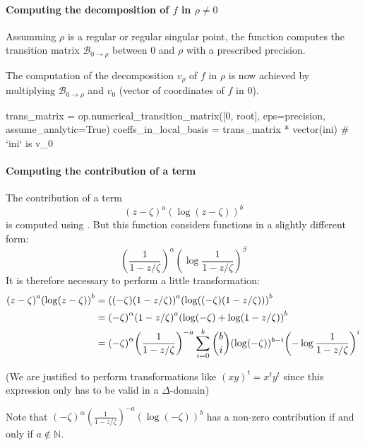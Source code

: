 \documentclass[../main.tex]{subfiles}
\begin{document}
\paragraph{Computing the decomposition of $f$ in $\rho \neq 0$}
Assumming $\rho$ is a regular or regular singular point, the function  computes the transition matrix $\mathcal{B}_{0 \to \rho}$ between 0 and $\rho$ with a prescribed precision.

The computation of the decomposition $v_\rho$ of $f$ in $\rho$ is now achieved by multiplying $\mathcal{B}_{0 \to \rho}$ and $v_0$ (vector of coordinates of $f$ in 0).

\begin{pyblock}
trans_matrix = op.numerical_transition_matrix([0, root],
											  eps=precision,
											  assume_analytic=True)
coeffs_in_local_basis = trans_matrix * vector(ini)  # `ini` is v_0
\end{pyblock}


\paragraph{Computing the contribution of a term}

The contribution of a term $${(z - \zeta)}^a {(\log (z - \zeta))}^b$$ is computed using . But this function considers functions in a slightly different form: $${\left(\frac{1}{1 - z/\zeta}\right)}^\alpha {\left(\log \frac{1}{1 - z/\zeta}\right)}^\beta$$
It is therefore necessary to perform a little transformation:
\begin{align*}
	{(z - \zeta)}^a {(\log (z - \zeta))}^b &= {((-\zeta)(1 - z/\zeta))}^a {(\log ((-\zeta)(1 - z/\zeta)))}^b \\
										   &= {(-\zeta)}^\alpha {(1 - z/\zeta)}^a {\left(\log (-\zeta) + \log (1 - z/\zeta)\right)}^b\\
										   &= {(-\zeta)}^\alpha {\left(\frac{1}{1 - z/\zeta}\right)}^{-a}
										   			\sum\limits_{i = 0}^b {b \choose i} (\log (-\zeta))^{b-i} {\left(-\log \frac{1}{1 - z/\zeta}\right)}^i
\end{align*}

(We are justified to perform transformations like $(xy)^t = x^t y^t$ since this expression only has to be valid in a $\Delta$-domain)

Note that ${(-\zeta)}^\alpha {\left(\frac{1}{1 - z/\zeta}\right)}^{-a} (\log (-\zeta))^b$ has a non-zero contribution if and only if $a \not\in \mathbb{N}$.
\end{document}
